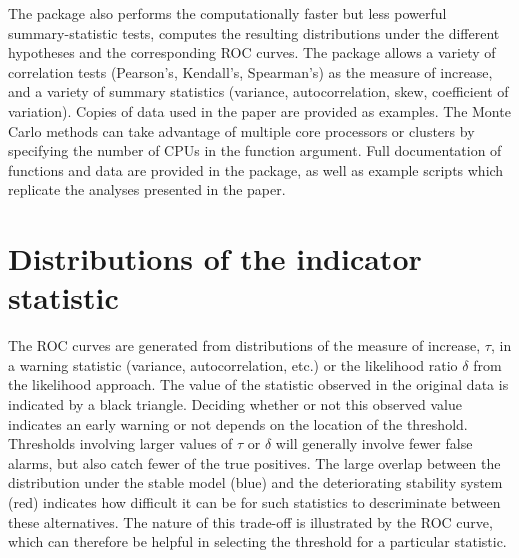 \documentclass[11pt]{elsarticle}
\begin{document}
The package also performs the computationally faster but less powerful summary-statistic tests, computes the resulting distributions under the different hypotheses and the corresponding ROC curves.  The package allows a variety of correlation tests (Pearson's, Kendall's, Spearman's) as the measure of increase, and a variety of summary statistics (variance, autocorrelation, skew, coefficient of variation).  Copies of data used in the paper are provided as examples.  The Monte Carlo methods can take advantage of multiple core processors or clusters by specifying the number of CPUs in the function argument.   Full documentation of functions and data are provided in the package, as well as example scripts which replicate the analyses presented in the paper.   

 \section{Distributions of the indicator statistic}
The ROC curves are generated from distributions of the measure of increase, $\tau$, in a warning statistic (variance, autocorrelation, etc.) or the likelihood ratio $\delta$ from the likelihood approach.  The value of the statistic observed in the original data is indicated by a black triangle. Deciding whether or not this observed value indicates an early warning or not depends on the location of the threshold.  Thresholds involving larger values of $\tau$ or $\delta$ will generally involve fewer false alarms, but also catch fewer of the true positives.  The large overlap between the distribution under the stable model (blue) and the deteriorating stability system (red) indicates how difficult it can be for such statistics to descriminate between these alternatives.  The nature of this trade-off is illustrated by the ROC curve, which can therefore be helpful in selecting the threshold for a particular statistic.  
\end{document}
